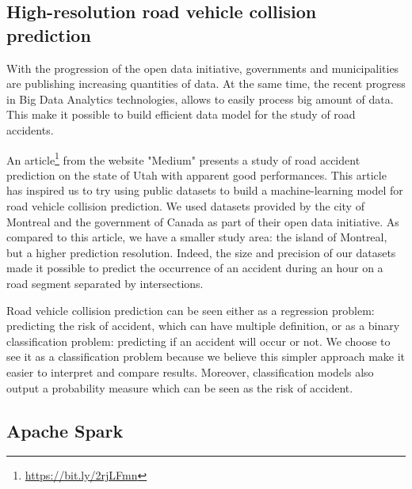 \documentclass[conference]{IEEEtran}
\begin{document}
\subsection{High-resolution road vehicle collision prediction}
With the progression of the open data initiative, governments and municipalities are publishing increasing quantities of data. At the same time, the recent progress in Big Data Analytics technologies, allows to easily process big amount of data. This make it possible to build efficient data model for the study of road accidents.

An article\protect\footnote{\url{https://bit.ly/2rjLFmn}} from the website "Medium" presents a study of road accident prediction on the state of Utah with apparent good performances. This article has inspired us to try using public datasets to build a machine-learning model for road vehicle collision prediction. We used datasets provided by the city of Montreal and the government of Canada as part of their open data initiative. As compared to this article, we have a smaller study area: the island of Montreal, but a higher prediction resolution. Indeed, the size and precision of our datasets made it possible to predict the occurrence of an accident during an hour on a road segment separated by intersections.

Road vehicle collision prediction can be seen either as a regression problem: predicting the risk of accident, which can have multiple definition, or as a binary classification problem: predicting if an accident will occur or not. We choose to see it as a classification problem because we believe this simpler approach make it easier to interpret and compare results. Moreover, classification models also output a probability measure which can be seen as the risk of accident.

\subsection{Apache Spark}
\end{document}
